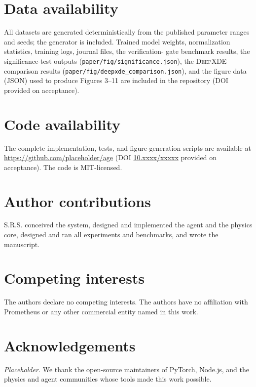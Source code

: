 \documentclass[11pt,a4paper]{article}
\begin{document}
\section*{Data availability}

All datasets are generated deterministically from the published parameter
ranges and seeds; the generator is included. Trained model weights,
normalization statistics, training logs, journal files, the verification-
gate benchmark results, the significance-test outputs
(\texttt{paper/fig/significance.json}), the \textsc{DeepXDE} comparison
results (\texttt{paper/fig/deepxde\_comparison.json}), and the figure data
(JSON) used to produce Figures 3--11 are included in the repository (DOI
provided on acceptance).

\section*{Code availability}

The complete implementation, tests, and figure-generation scripts are
available at \url{https://github.com/placeholder/age} (DOI
\href{https://doi.org/10.xxxx/xxxxx}{10.xxxx/xxxxx} provided on
acceptance). The code is MIT-licensed.

\section*{Author contributions}

S.R.S. conceived the system, designed and implemented the agent and the
physics core, designed and ran all experiments and benchmarks, and wrote
the manuscript.

\section*{Competing interests}

The authors declare no competing interests. The authors have no affiliation
with Prometheus or any other commercial entity named in this work.

\section*{Acknowledgements}

\textit{Placeholder.} We thank the open-source maintainers of PyTorch, Node.js,
and the physics and agent communities whose tools made this work possible.
\end{document}
